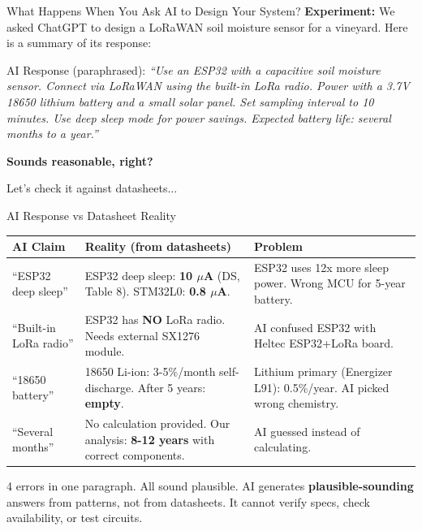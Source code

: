 \documentclass[aspectratio=169,11pt]{beamer}
\begin{document}
\begin{frame}{What Happens When You Ask AI to Design Your System?}
    \textbf{Experiment:} We asked ChatGPT to design a LoRaWAN soil moisture sensor for a vineyard. Here is a summary of its response:
    
    \vspace{0.2cm}
    \begin{block}{AI Response (paraphrased):}
        \textit{``Use an ESP32 with a capacitive soil moisture sensor. Connect via LoRaWAN using the built-in LoRa radio. Power with a 3.7V 18650 lithium battery and a small solar panel. Set sampling interval to 10 minutes. Use deep sleep mode for power savings. Expected battery life: several months to a year.''}
    \end{block}
    
    \vspace{0.2cm}
    \textbf{Sounds reasonable, right?}
    
    \vspace{0.2cm}
    Let's check it against datasheets...
\end{frame}

\begin{frame}{AI Response vs Datasheet Reality}
    \footnotesize
    \begin{center}
    \begin{tabular}{p{2.8cm}p{4cm}p{4.5cm}}
        \toprule
        \textbf{AI Claim} & \textbf{Reality (from datasheets)} & \textbf{Problem} \\
        \midrule
        ``ESP32 deep sleep'' & ESP32 deep sleep: \textbf{10 $\mu$A} (DS, Table 8). STM32L0: \textbf{0.8 $\mu$A}. & ESP32 uses 12x more sleep power. Wrong MCU for 5-year battery. \\
        \addlinespace
        ``Built-in LoRa radio'' & ESP32 has \textbf{NO} LoRa radio. Needs external SX1276 module. & AI confused ESP32 with Heltec ESP32+LoRa board. \\
        \addlinespace
        ``18650 battery'' & 18650 Li-ion: 3-5\%/month self-discharge. After 5 years: \textbf{empty}. & Lithium primary (Energizer L91): 0.5\%/year. AI picked wrong chemistry. \\
        \addlinespace
        ``Several months'' & No calculation provided. Our analysis: \textbf{8-12 years} with correct components. & AI guessed instead of calculating. \\
        \bottomrule
    \end{tabular}
    \end{center}
    \normalsize
    
    \begin{alertblock}{4 errors in one paragraph. All sound plausible.}
        AI generates \textbf{plausible-sounding} answers from patterns, not from datasheets. It cannot verify specs, check availability, or test circuits.
    \end{alertblock}
\end{frame}
\end{document}
